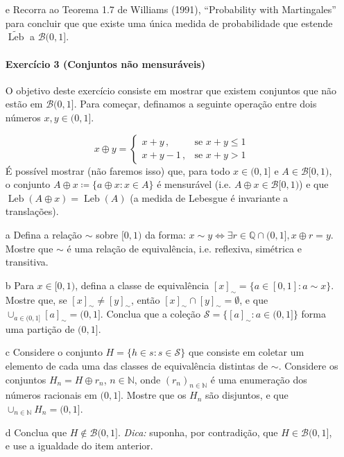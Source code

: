 \documentclass[10pt,a4paper]{article}
\begin{document}
\begin{itemize}
		\item[e] Recorra ao Teorema 1.7 de Williams (1991), ``Probability with Martingales'' para concluir que que existe uma única medida de probabilidade que estende $\widetilde{\operatorname{Leb}}$  a  $\mathcal{B}(0,1]$.
		
		
		\paragraph{Exercício 3 (Conjuntos não mensuráveis)} O objetivo deste exercício consiste em mostrar que existem conjuntos que não estão em $\mathcal{B}(0,1]$.
	Para começar, definamos a seguinte operação entre dois números $x,y \in (0,1]$.
			
			$$x\oplus y = \begin{cases}
				x+y \, , & \text{se } x+ y \leq 1\\
				x+y -1\, , & \text{se } x+y > 1
			\end{cases}$$
					É possível mostrar (não faremos isso) que, para todo $x \in (0,1]$ e $A\in \mathcal{B}[0,1)$, o conjunto $A\oplus x \coloneqq \{a \oplus x: x \in A\}$ é mensurável (i.e. $A\oplus x \in \mathcal{B}[0,1)$) e que $\operatorname{Leb}(A\oplus x) = \operatorname{Leb}(A)$ (a medida de Lebesgue é invariante a translações).
			
			\item[a] Defina a relação $\sim$ sobre $[0,1)$ da forma:
			$x\sim y \iff \exists r \in \mathbb{Q}\cap (0,1], x \oplus r  = y$. Mostre que $\sim$ é uma relação de equivalência, i.e. reflexiva, simétrica e transitiva.
			\item[b] Para $x \in [0,1)$, defina a classe de equivalência $[x]_{\sim} = \{a \in [0,1]: a \sim x\}$. Mostre que, se $[x]_{\sim} \neq [y]_{\sim}$, então $[x]_{\sim} \cap [y]_{\sim} = \emptyset$, e que $\cup_{a \in (0,1]} [a]_{\sim} = (0,1]$. Conclua que a coleção $\mathcal{S} = \{[a]_{\sim}: a \in (0,1]\}$ forma uma partição de $(0,1]$.
			\item[c] Considere o conjunto $H = \{h \in s: s \in \mathcal{S}\}$ que consiste em coletar um elemento de cada uma das classes de equivalência distintas de $\sim$. Considere os conjuntos $H_n = H \oplus r_n$, $n \in \mathbb{N}$, onde $(r_n)_{n \in \mathbb{N}}$ é uma enumeração dos números racionais em $(0,1]$. Mostre que os $H_n$ são disjuntos, e que $\cup_{n \in \mathbb{N}} H_n = (0,1]$.
			\item[d] Conclua que $H \notin \mathcal{B}(0,1]$. \textit{Dica:} suponha, por contradição, que $H \in \mathcal{B}(0,1]$, e use a igualdade do item anterior.
		\end{itemize}
\end{document}
